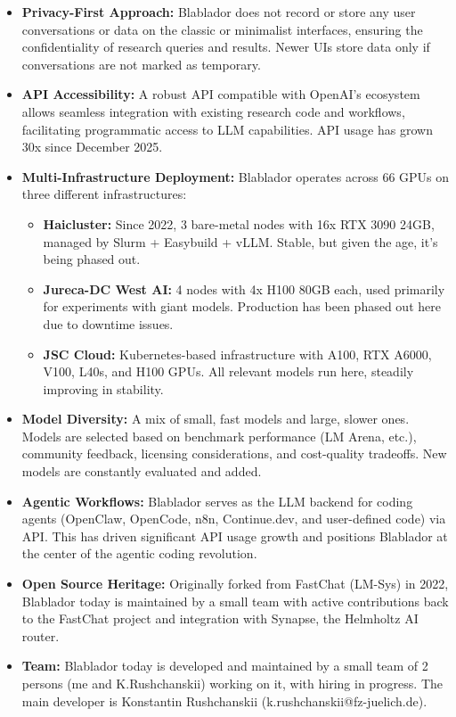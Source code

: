 \documentclass[10pt,conference]{IEEEtran}
\begin{document}
\begin{itemize}
    \item \textbf{Privacy-First Approach:} Blablador does not record or store any user conversations or data on the classic or minimalist interfaces, ensuring the confidentiality of research queries and results. Newer UIs store data only if conversations are not marked as temporary.
    
    \item \textbf{API Accessibility:} A robust API compatible with OpenAI's ecosystem allows seamless integration with existing research code and workflows, facilitating programmatic access to LLM capabilities. API usage has grown 30x since December 2025.
    
    \item \textbf{Multi-Infrastructure Deployment:} Blablador operates across 66 GPUs on three different infrastructures:
    \begin{itemize}
        \item \textbf{Haicluster:} Since 2022, 3 bare-metal nodes with 16x RTX 3090 24GB, managed by Slurm + Easybuild + vLLM. Stable, but given the age, it's being phased out.
        \item \textbf{Jureca-DC West AI:} 4 nodes with 4x H100 80GB each, used primarily for experiments with giant models. Production has been phased out here due to downtime issues.
        \item \textbf{JSC Cloud:} Kubernetes-based infrastructure with A100, RTX A6000, V100, L40s, and H100 GPUs. All relevant models run here, steadily improving in stability.
    \end{itemize}
    
    \item \textbf{Model Diversity:} A mix of small, fast models and large, slower ones. Models are selected based on benchmark performance (LM Arena, etc.), community feedback, licensing considerations, and cost-quality tradeoffs. New models are constantly evaluated and added.
    
    \item \textbf{Agentic Workflows:} Blablador serves as the LLM backend for coding agents (OpenClaw, OpenCode, n8n, Continue.dev, and user-defined code) via API. This has driven significant API usage growth and positions Blablador at the center of the agentic coding revolution.
    
    \item \textbf{Open Source Heritage:} Originally forked from FastChat (LM-Sys) in 2022, Blablador today is maintained by a small team with active contributions back to the FastChat project and integration with Synapse, the Helmholtz AI router.
    
    \item \textbf{Team:} Blablador today is developed and maintained by a small team of 2 persons (me and K.Rushchanskii) working on it, with hiring in progress. The main developer is Konstantin Rushchanskii (k.rushchanskii@fz-juelich.de).
\end{itemize}
\end{document}
